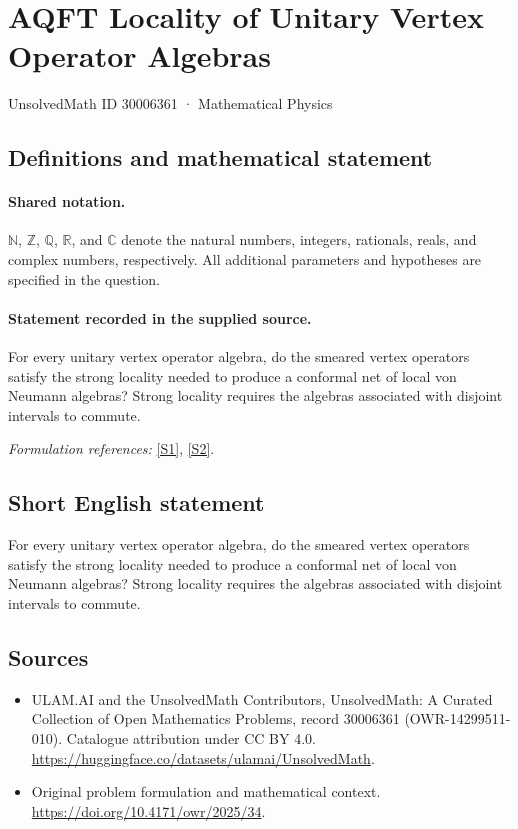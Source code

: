 \documentclass[11pt]{article}
\newcommand{\sref}[2]{\hyperlink{source:#1:#2}{[S#2]}}
\begin{document}
\setcounter{section}{30006360}
\section{AQFT Locality of Unitary Vertex Operator Algebras}\label{30006361}
{\small UnsolvedMath ID 30006361 · Mathematical Physics}
\subsection{Definitions and mathematical statement}

\paragraph{Shared notation.}$\mathbb N$, $\mathbb Z$, $\mathbb Q$, $\mathbb R$, and $\mathbb C$ denote the natural numbers, integers, rationals, reals, and complex numbers, respectively. All additional parameters and hypotheses are specified in the question.


\paragraph{Statement recorded in the supplied source.}
For every unitary vertex operator algebra, do the smeared vertex operators satisfy the strong locality needed to produce a conformal net of local von Neumann algebras? Strong locality requires the algebras associated with disjoint intervals to commute.
\par\smallskip\textit{Formulation references:} \sref{30006361}{1}, \sref{30006361}{2}.
\subsection{Short English statement}
For every unitary vertex operator algebra, do the smeared vertex operators satisfy the strong locality needed to produce a conformal net of local von Neumann algebras? Strong locality requires the algebras associated with disjoint intervals to commute.
\subsection{Sources}
\begin{itemize}
\item[\hypertarget{source:30006361:1}{S1}] ULAM.AI and the UnsolvedMath Contributors, UnsolvedMath: A Curated Collection of Open Mathematics Problems, record 30006361 (OWR-14299511-010). Catalogue attribution under CC BY 4.0.
\url{https://huggingface.co/datasets/ulamai/UnsolvedMath}.
\item[\hypertarget{source:30006361:2}{S2}] Original problem formulation and mathematical context.
\url{https://doi.org/10.4171/owr/2025/34}.
\end{itemize}
\label{end:30006361}
\end{document}
